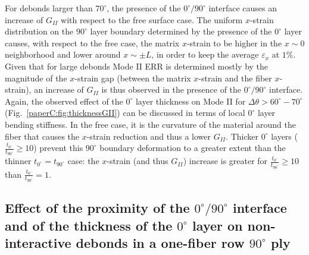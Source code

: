 For debonds larger than $70^{\circ}$, the presence of the $0^{\circ}/90^{\circ}$ interface causes an increase of $G_{II}$ with respect to the free surface case. The uniform $x$-strain distribution on the $90^{\circ}$ layer boundary determined by the presence of the $0^{\circ}$ layer causes, with respect to the free case, the matrix $x$-strain to be higher in the $x\sim0$ neighborhood and lower around $x\sim\pm L$, in order to keep the average $\varepsilon_{x}$ at $1\%$. Given that for large debonds Mode II ERR is determined mostly by the magnitude of the $x$-strain gap (between the matrix $x$-strain and the fiber $x$-strain), an increase of $G_{II}$ is thus observed in the presence of the $0^{\circ}/90^{\circ}$ interface. Again, the observed effect of the $0^{\circ}$ layer thickness on Mode II for $\Delta\theta>60^{\circ}-70^{\circ}$ (Fig.~\ref{paperC:fig:thicknessGII}) can be discussed in terms of local $0^{\circ}$ layer bending stiffness. In the free case, it is the curvature of the material around the fiber that causes the $x$-strain reduction and thus a lower $G_{II}$. Thicker $0^{\circ}$ layers ($\frac{t_{0^{\circ}}}{t_{90^{\circ}}}\geq10$) prevent this $90^{\circ}$ boundary deformation to a greater extent than the thinner $t_{0^{\circ}}=t_{90^{\circ}}$ case: the $x$-strain (and thus $G_{II}$) increase is greater for $\frac{t_{0^{\circ}}}{t_{90^{\circ}}}\geq10$ than $\frac{t_{0^{\circ}}}{t_{90^{\circ}}}=1$.

\subsection{Effect of the proximity of the $0^{\circ}/90^{\circ}$ interface and of the thickness of the $0^{\circ}$ layer on non-interactive debonds in a one-fiber row $90^{\circ}$ ply}\label{paperC:subsec:debonddebondinter}

